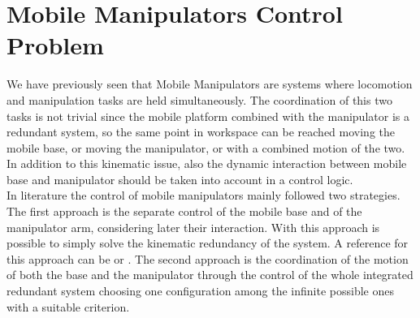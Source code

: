 \chapter{Mobile Manipulators Control Problem}
\label{chapter4}
We have previously seen that Mobile Manipulators are systems where locomotion and manipulation tasks are held simultaneously. The coordination of this two tasks is not trivial since the mobile platform combined with the manipulator is a redundant system, so the same point in workspace can be reached moving the mobile base, or moving the manipulator, or with a combined motion of the two. In addition to this kinematic issue, also the dynamic interaction between mobile base and manipulator should be taken into account in a control logic. \\
In literature the control of mobile manipulators mainly followed two strategies. The first approach is the separate control of the mobile base and of the manipulator arm, considering later their interaction. With this approach is possible to simply solve the kinematic redundancy of the system. A reference for this approach can be \cite{liulewis} or \cite{chung1998interaction}. The second approach is the coordination of the motion of both the base and the manipulator through the control of the whole integrated redundant system choosing one configuration among the infinite possible ones with a suitable criterion.\\
